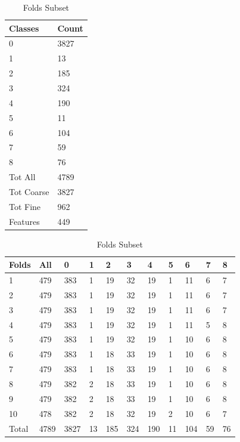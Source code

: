 \documentclass[ms]{nuthesis}
\begin{document}
\FloatBarrier
\begin{table}[!htb]
\centering
  \caption{The subset of instances used for tuning classifier parameters contains approximately
  $1/5$ and retains all positive instances.}
  \label{tab:subset}
\begin{subtable}{.25\linewidth}
  \centering
  \begin{tabular}{|l||l|}\toprule
    Classes & Count \\ \midrule
    0 & 3827 \\
    1 & 13 \\
    2 & 185 \\
    3 & 324 \\
    4 & 190 \\
    5 & 11 \\
    6 & 104 \\
    7 & 59 \\
    8 & 76 \\ \midrule
    Tot All & 4789 \\
    Tot Coarse & 3827 \\
    Tot Fine & 962 \\
    Features & 449 \\ \bottomrule
  \end{tabular}
  \caption{Classes Subset}
  \label{tab:ClassesSub}
\end{subtable}%
\begin{subtable}{.75\linewidth}
\centering
  \begin{tabular}{|l||l||l||l||l||l||l||l||l||l||l|}\toprule
    Folds & All & 0 & 1 & 2 & 3 & 4 & 5 & 6 & 7 & 8 \\ \midrule
    1 & 479 & 383 & 1 & 19 & 32 & 19 & 1 & 11 & 6 & 7 \\
    2 & 479 & 383 & 1 & 19 & 32 & 19 & 1 & 11 & 6 & 7 \\
    3 & 479 & 383 & 1 & 19 & 32 & 19 & 1 & 11 & 6 & 7 \\
    4 & 479 & 383 & 1 & 19 & 32 & 19 & 1 & 11 & 5 & 8 \\
    5 & 479 & 383 & 1 & 19 & 32 & 19 & 1 & 10 & 6 & 8 \\
    6 & 479 & 383 & 1 & 18 & 33 & 19 & 1 & 10 & 6 & 8 \\
    7 & 479 & 383 & 1 & 18 & 33 & 19 & 1 & 10 & 6 & 8 \\
    8 & 479 & 382 & 2 & 18 & 33 & 19 & 1 & 10 & 6 & 8 \\
    9 & 479 & 382 & 2 & 18 & 33 & 19 & 1 & 10 & 6 & 8 \\
    10 & 478 & 382 & 2 & 18 & 32 & 19 & 2 & 10 & 6 & 7 \\ \midrule
    Total & 4789 & 3827 & 13 & 185 & 324 & 190 & 11 & 104 & 59 & 76 \\ \bottomrule
  \end{tabular}
  \caption{Folds Subset}
  \label{tab:PartitionsSubset}
  \end{subtable}
\end{table}
\FloatBarrier
\end{document}

